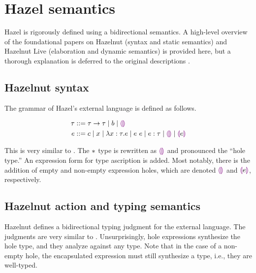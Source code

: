 \section{Hazel semantics}
\label{sec:hazel-semantics}

Hazel is rigorously defined using a bidirectional semantics. A high-level overview of the foundational papers on Hazelnut (syntax and static semantics) and Hazelnut Live (elaboration and dynamic semantics) is provided here, but a thorough explanation is deferred to the original descriptions \cite{conf/popl/Hazelnut17,conf/popl/HazelnutLive19}.

\subsection{Hazelnut syntax}
\label{sec:hazel-syntax}

The grammar of Hazel's external language is defined as follows.

\begin{singlespace}
  \begin{align*}
    \tau &::= \tau\to\tau
           \mid b
           \mid \textcolor{violet}{\llparenthesis}\textcolor{violet}{\rrparenthesis} \\
    e &::= c
        \mid x
        \mid\lambda x:\tau.e
        \mid e\ e
        \mid e:\tau
        \mid \textcolor{violet}{\llparenthesis}\textcolor{violet}{\rrparenthesis}
        \mid \textcolor{violet}{\llparenthesis} e\textcolor{violet}{\rrparenthesis}
  \end{align*}
\end{singlespace}

This is very similar to \gtlc{}. The $*{}$ type is rewritten as $\textcolor{violet}{\llparenthesis}\textcolor{violet}{\rrparenthesis}$ and pronounced the ``hole type.'' An expression form for type ascription is added. Most notably, there is the addition of empty and non-empty expression holes, which are denoted $\textcolor{violet}{\llparenthesis}\textcolor{violet}{\rrparenthesis}$ and $\textcolor{violet}{\llparenthesis} e\textcolor{violet}{\rrparenthesis}$, respectively.

\subsection{Hazelnut action and typing semantics}
\label{sec:hazel-statics}

Hazelnut \cite{conf/popl/Hazelnut17} defines a bidirectional typing judgment for the external language.  The judgments are very similar to \gtlc{}. Unsurprisingly, hole expressions synthesize the hole type, and they analyze against any type. Note that in the case of a non-empty hole, the encapsulated expression must still synthesize a type, i.e., they are well-typed.

